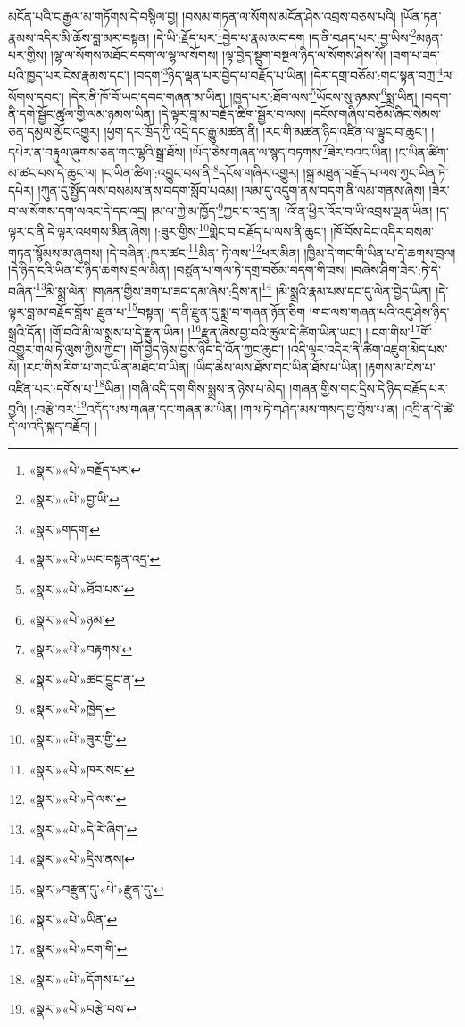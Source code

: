 མངོན་པའི་ང་རྒྱལ་མ་གཏོགས་དེ་བསྙིལ་བྱ། །བསམ་གཏན་ལ་སོགས་མངོན་ཤེས་འབྲས་བཅས་པའི། །ཡོན་ཏན་རྣམས་འདིར་མི་ཆོས་བླ་མར་བསྟན། །དེ་ཡི་:རྗོད་པར་\footnote{«སྣར་»«པེ་»བརྗོད་པར་}བྱེད་པ་རྣམ་མང་དག །ད་ནི་བཤད་པར་:བྱ་ཡིས་\footnote{«སྣར་»«པེ་»བྱ་ཡི་}མཉན་པར་གྱིས། །ལྷ་ལ་སོགས་མཐོང་བདག་ལ་ལྷ་ལ་སོགས། །ལྟ་བྱེད་སྡུག་བསྔལ་ཉིད་ལ་སོགས་ཤེས་སོ། །ཟག་པ་ཟད་པའི་ཁྱད་པར་ངེས་རྣམས་དང་། །བདག་\footnote{«སྣར་»གདག་}ཉིད་ལྡན་པར་བྱེད་པ་བརྗོད་པ་ཡིན། །དེར་དགྲ་བཅོམ་:གང་སྟན་བཀྲ་\footnote{«སྣར་»«པེ་»ཡང་བསྟན་འདྲ་}ལ་སོགས་དབང་། །དེར་ནི་ཁོ་བོ་ཡང་དབང་གཞན་མ་ཡིན། །ཁྱད་པར་:ཐོབ་ལས་\footnote{«སྣར་»«པེ་»ཐོབ་པས་}ཡོངས་སུ་ཉམས་\footnote{«སྣར་»«པེ་»ཉམ་}སྨྲ་ཡིན། །བདག་ནི་དགེ་སྦྱོང་ཚུལ་གྱི་ལམ་ཉམས་ཡིན། །དེ་ལྟར་བླ་མ་བརྗོད་ཚིག་སྦྱོར་བ་ལས། །དངོས་གཞིས་བཅོམ་ཞིང་སེམས་ཅན་དམྱལ་མྱོང་འགྱུར། །ཕྱག་དར་ཁྲོད་ཀྱི་འདྲེ་དང་རྒྱུ་མཚན་ནི། །རང་གི་མཚན་ཉིད་འཛིན་ལ་ལྟུང་བ་ཆུང་། །དཔེར་ན་བརྟུལ་ཞུགས་ཅན་གང་ལྷའི་སྒྲ་ཐོས། །ཡོད་ཅེས་གཞན་ལ་སྙད་བཏགས་\footnote{«སྣར་»«པེ་»བརྟགས་}ཟེར་བའང་ཡིན། །ང་ཡིན་ཚིག་མ་ཚང་པས་དེ་ཆུང་ལ། །ང་ཡིན་ཚིག་:འབྱུང་བས་ནི་\footnote{«སྣར་»«པེ་»ཚང་བྱུང་ན་}དངོས་གཞིར་འགྱུར། །སྒྲ་མཐུན་བརྗོད་པ་ལས་ཀྱང་ཡིན་ཏེ་དཔེར། །ཀུན་དུ་སྤྱོད་ལས་བསམས་ནས་བདག་སློབ་པའམ། །ལམ་དུ་འདུག་ནས་བདག་ནི་ལམ་གནས་ཞེས། །ཟེར་བ་ལ་སོགས་དག་ལའང་དེ་དང་འདྲ། །མ་ལ་ཀྱེ་མ་ཁྱོད་\footnote{«སྣར་»«པེ་»ཁྱེད་}ཀྱང་ང་འདྲ་ན། །འོ་ན་ཕྱིར་འོང་བ་ཡི་འབྲས་ལྡན་ཡིན། །ད་ལྟར་ང་ནི་དེ་ལྟར་འཕགས་མིན་ཞེས། །:ཟུར་གྱིས་\footnote{«སྣར་»«པེ་»ཟུར་གྱི་}གླེང་བ་བརྗོད་པ་ལས་ནི་ཆུང་། །ཁོ་བོས་དེང་འདིར་བསམ་གཏན་སྙོམས་མ་ཞུགས། །དེ་བཞིན་:ཁར་ཚང་\footnote{«སྣར་»«པེ་»ཁར་སང་}མིན་:ཏེ་ལས་\footnote{«སྣར་»«པེ་»དེ་ལས་}ཕར་མིན། །ཁྱིམ་དེ་གང་གི་ཡིན་པ་དེ་ཆགས་བྲལ། །དེ་ཉིད་ངའི་ཡིན་ང་ཉིད་ཆགས་བྲལ་མིན། །བཙུན་པ་གལ་ཏེ་དགྲ་བཅོམ་བདག་གི་ཟས། །བཞེས་ཤིག་ཟེར་:ཏེ་དེ་བཞིན་\footnote{«སྣར་»«པེ་»དེ་རེ་ཞིག་}མི་སྨྲ་ལེན། །གཞན་གྱིས་ཟག་པ་ཟད་དམ་ཞེས་:དྲིས་ན།\footnote{«སྣར་»«པེ་»དྲིས་ནས།} །མི་སྨྲའི་རྣམ་པས་དང་དུ་ལེན་བྱེད་ཡིན། །དེ་ལྟར་བླ་མ་བརྗོད་བློས་:རྫུན་པ་\footnote{«སྣར་»བརྫུན་དུ་«པེ་»རྫུན་དུ་}བསྟན། །ད་ནི་རྫུན་དུ་སྨྲ་བ་གཞན་ཉོན་ཅིག །གང་ལས་གཞན་པའི་འདུ་ཤེས་ཉིད་སྒྲའི་དོན། །གོ་བའི་མི་ལ་སྨྲས་པ་དེ་རྫུན་ཡིན། །\footnote{«སྣར་»«པེ་»ཡིན་}རྫུན་ཞེས་བྱ་བའི་ཚུལ་དེ་ཚིག་ཡིན་ཡང་། །:ངག་གིས་\footnote{«སྣར་»«པེ་»ངག་གི་}གོ་འགྱུར་གལ་ཏེ་ལུས་ཀྱིས་ཀྱང་། །གོ་བྱེད་ཉེས་བྱས་ཉིད་དེ་འོན་ཀྱང་ཆུང་། །འདི་ལྟར་འདིར་ནི་ཚིག་འཇུག་མེད་པས་སོ། །རང་གིས་རིག་པ་གང་ཡིན་མཐོང་བ་ཡིན། །ཡིད་ཆེས་ལས་ཐོས་གང་ཡིན་ཐོས་པ་ཡིན། །རྟགས་མ་ངེས་པ་འཛིན་པར་:དགོས་པ་\footnote{«སྣར་»«པེ་»དོགས་པ་}ཡིན། །གཞི་འདི་དག་གིས་སྨྲས་ན་ཉེས་པ་མེད། །གཞན་གྱིས་གང་དྲིས་དེ་ཉིད་བརྗོད་པར་བྱའི། །:བརྩེ་བར་\footnote{«སྣར་»«པེ་»བརྩེ་བས་}འདོད་པས་གཞན་དང་གཞན་མ་ཡིན། །གལ་ཏེ་གཤེད་མས་གསད་བྱ་བྲོས་པ་ན། །འདྲི་ན་དེ་ཚེ་དེ་ལ་འདི་སྐད་བརྗོད། །

